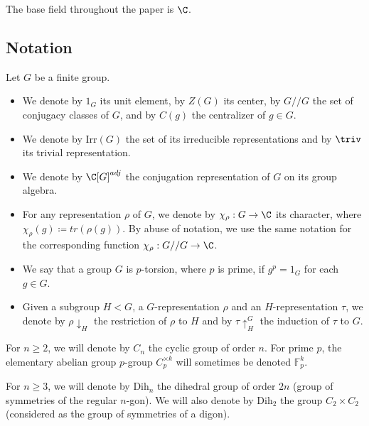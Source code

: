 The base field throughout the paper is $\C$.
\subsection{Notation}
\begin{nota}
 Let $G$ be a finite group.
 \begin{itemize}
 \item We denote by $1_G$ its unit element, by $Z(G)$ its center, by $G//G$ the set of conjugacy classes of $G$, and by $C(g)$ the centralizer of $g\in G$.
  \item We denote by $\mathrm{Irr}(G)$ the set of its irreducible representations and by $\triv$ its trivial representation. 
  \item We denote by $\C[G]^{adj}$ the conjugation representation of $G$ on its group algebra.
  \item For any representation $\rho$ of $G$, we denote by $\chi_\rho: G\to \C$ its character, where $\chi_\rho(g)\coloneqq tr (\rho(g))$. By abuse of notation, we use the same notation for the corresponding function $\chi_\rho: G//G \to \C$.
 \item We say that a group $G$ is $p$-torsion, where $p$ is prime, if $g^p = 1_G$ for each $g \in G$.
 \item Given a subgroup $H < G$, a $G$-representation $\rho$ and an $H$-representation $\tau$, we denote by $\rho \downarrow_H$ the restriction of $\rho$ to $H$ and by $\tau \uparrow^G_H$ the induction of $\tau$ to $G$.
 \end{itemize}

\end{nota}

\begin{nota}
 {For $n\geq 2$, we will denote by $C_n$ the cyclic group of order $n$. For prime $p$, the elementary abelian group $p$-group $C_p^{\times k}$ will sometimes be denoted $\mathbb{F}_p^k$.}
\end{nota}

\begin{nota}
 {For $n\geq 3$,} we will denote by $\mathrm{Dih}_n$ the dihedral group of order $2n$ (group of symmetries of the regular $n$-gon). {We will also denote by $\mathrm{Dih}_2$ the group $C_2 \times C_2$ (considered as the group of symmetries of a digon).}
\end{nota}

